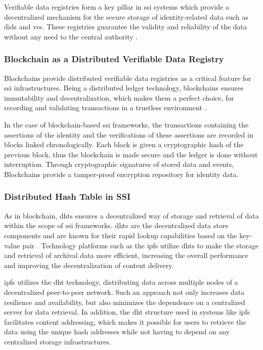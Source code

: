 Verifiable data registries form a key pillar in \gls{ssi} systems which provide a decentralized mechanism for the secure storage of identity-related data
such as \gls{did}s and \gls{vc}s. These registries guarantee the validity and reliability of the data without any need to the 
central authority \cite{w3cvcdatamodel}.

\subsubsection{Blockchain as a Distributed Verifiable Data Registry} 

Blockchains provide distributed verifiable data registries as a critical feature for \gls{ssi} infrastructures. Being a distributed ledger technology, blockchains ensures 
immutability and decentralization, which makes them a perfect choice, for recording and validating transactions in a trustless environment \cite{9869618}.

In the case of blockchain-based \gls{ssi} frameworks, the transactions containing the assertions of the identity and the verifications of these assertions are recorded in blocks 
linked chronologically. Each block is given a cryptographic hash of the previous block, thus the blockchain is made secure and the ledger is done without interruption. 
Through cryptographic signatures of stored data and events, Blockchains provide a tamper-proof encryption repository for identity data.

\subsubsection{Distributed Hash Table in SSI}

As in blockchain, \gls{dht}s ensures a decentralized way of storage and retrieval of data within the scope of \gls{ssi} frameworks. \gls{dht}s are the decentralized 
data store components and are known for their rapid lookup capabilities based on the key-value pair \cite{9869618}. Technology platforms such as the \gls{ipfs} 
utilize \gls{dht}s to make the storage and retrieval of archival data more efficient, increasing the overall performance and improving the decentralization of content delivery.

\gls{ipfs} utilizes the \gls{dht} technology, distributing data across multiple nodes of a decentralized peer-to-peer network. Such an approach not only increases data resilience and 
availability, but also minimizes the dependence on a centralized server for data retrieval. In addition, the \gls{dht} structure used in systems like \gls{ipfs} facilitates content 
addressing, which makes it possible for users to retrieve the data using the unique hash addresses while not having to depend on any centralized storage infrastructures.

